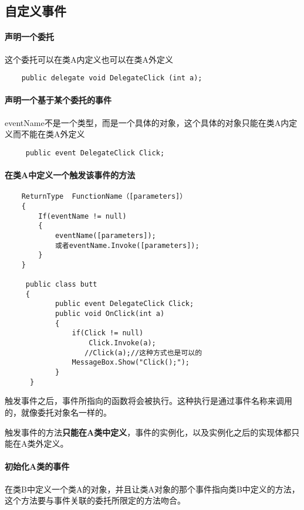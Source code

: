 \documentclass[UTF8,a4paper,12pt]{ctexbook}
\begin{document}
		\subsection{自定义事件}
			\paragraph{声明一个委托}
			
				这个委托可以在类A内定义也可以在类A外定义
			
				\begin{lstlisting}
	public delegate void DelegateClick (int a);
				\end{lstlisting}
			\paragraph{声明一个基于某个委托的事件}
				
				eventName不是一个类型，而是一个具体的对象，这个具体的对象只能在类A内定义而不能在类A外定义
				
				\begin{lstlisting}
	 public event DelegateClick Click;
				\end{lstlisting}
				
			\paragraph{在类A中定义一个触发该事件的方法}
				
				\begin{lstlisting}
	ReturnType  FunctionName（[parameters]）	
	{
		If(eventName != null)
		{
			eventName([parameters]);
			或者eventName.Invoke([parameters]);
		}
	}
	
	 public class butt
	 {
	        public event DelegateClick Click;
	        public void OnClick(int a)
	        {
	            if(Click != null)
	                Click.Invoke(a);
	               //Click(a);//这种方式也是可以的
	            MessageBox.Show("Click();");
	        }
	  }
				\end{lstlisting}
			
				触发事件之后，事件所指向的函数将会被执行。这种执行是通过事件名称来调用的，就像委托对象名一样的。
				
				触发事件的方法\textbf{只能在A类中定义}，事件的实例化，以及实例化之后的实现体都只能在A类外定义。
				
			\paragraph{初始化A类的事件}
				在类B中定义一个类A的对象，并且让类A对象的那个事件指向类B中定义的方法，这个方法要与事件关联的委托所限定的方法吻合。
			
\end{document}
